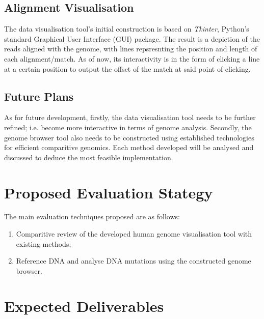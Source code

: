 \documentclass{csfyp}
\begin{document}
\subsection{Alignment Visualisation}
The data visualisation tool's initial construction is based on {\textit{Tkinter}}, Python's standard Graphical User Interface (GUI) package.  The result is a depiction of the reads aligned with the genome, with lines repsresnting the position and length of each alignment/match.  As of now, its interactivity is in the form of clicking a line at a certain position to output the offset of the match at said point of clicking.     

\subsection{Future Plans}
As for future development, firstly, the data visualisation tool needs to be further refined; i.e. become more interactive in terms of genome analysis.  Secondly, the genome browser tool also needs to be constructed using established technologies for efficient comparitive genomics.  Each method developed will be analysed and discussed to deduce the most feasible implementation.   


\section{Proposed Evaluation Stategy}

The main evaluation techniques proposed are as follows:

\begin{enumerate}[nolistsep]

  \item Comparitive review of the developed human genome visualisation tool with existing methods;

  \item Reference DNA and analyse DNA mutations using the constructed genome browser.

\end{enumerate}


\section{Expected Deliverables}
\end{document}
